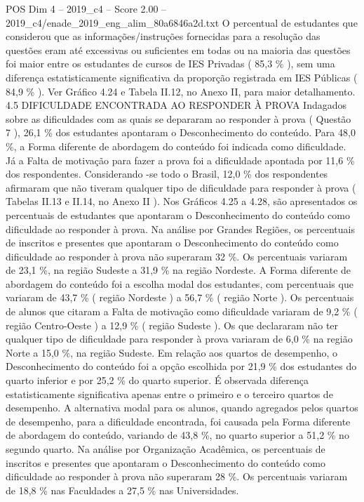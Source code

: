 \begin{textsample}{POS Dim 4 – 2019\_c4 – Score 2.00 – 2019\_c4/enade\_2019\_eng\_alim\_80a6846a2d.txt}
O percentual de estudantes que considerou que as informações/instruções fornecidas para a resolução das questões eram até excessivas ou suficientes em todas ou na maioria das questões foi maior entre os estudantes de cursos de IES Privadas ( 85,3 \% ), sem uma diferença estatisticamente significativa da proporção registrada em IES Públicas ( 84,9 \% ).
Ver Gráfico 4.24 e Tabela II.12, no Anexo II, para maior detalhamento. 4.5 DIFICULDADE ENCONTRADA AO RESPONDER À PROVA Indagados sobre as dificuldades com as quais se depararam ao responder à prova ( Questão 7 ), 26,1 \% dos estudantes apontaram o Desconhecimento do conteúdo.
Para 48,0 \%, a Forma diferente de abordagem do conteúdo foi indicada como dificuldade.
Já a Falta de motivação para fazer a prova foi a dificuldade apontada por 11,6 \% dos respondentes.
Considerando -se todo o Brasil, 12,0 \% dos respondentes afirmaram que não tiveram qualquer tipo de dificuldade para responder à prova ( Tabelas II.13 e II.14, no Anexo II ).
Nos Gráficos 4.25 a 4.28, são apresentados os percentuais de estudantes que apontaram o Desconhecimento do conteúdo como dificuldade ao responder à prova.
Na análise por Grandes Regiões, os percentuais de inscritos e presentes que apontaram o Desconhecimento do conteúdo como dificuldade ao responder à prova não superaram 32 \%.
Os percentuais variaram de 23,1 \%, na região Sudeste a 31,9 \% na região Nordeste.
A Forma diferente de abordagem do conteúdo foi a escolha modal dos estudantes, com percentuais que variaram de 43,7 \% ( região Nordeste ) a 56,7 \% ( região Norte ).
Os percentuais de alunos que citaram a Falta de motivação como dificuldade variaram de 9,2 \% ( região Centro-Oeste ) a 12,9 \% ( região Sudeste ).
Os que declararam não ter qualquer tipo de dificuldade para responder à prova variaram de 6,0 \% na região Norte a 15,0 \%, na região Sudeste.
Em relação aos quartos de desempenho, o Desconhecimento do conteúdo foi a opção escolhida por 21,9 \% dos estudantes do quarto inferior e por 25,2 \% do quarto superior.
É observada diferença estatisticamente significativa apenas entre o primeiro e o terceiro quartos de desempenho.
A alternativa modal para os alunos, quando agregados pelos quartos de desempenho, para a dificuldade encontrada, foi causada pela Forma diferente de abordagem do conteúdo, variando de 43,8 \%, no quarto superior a 51,2 \% no segundo quarto.
Na análise por Organização Acadêmica, os percentuais de inscritos e presentes que apontaram o Desconhecimento do conteúdo como dificuldade ao responder à prova não superaram 28 \%.
Os percentuais variaram de 18,8 \% nas Faculdades a 27,5 \% nas Universidades.

\end{textsample}
